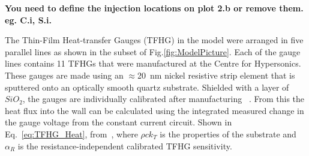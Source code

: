 \documentclass{AIAA}
\begin{document}
\textbf{You need to define the injection locations on plot 2.b or remove them. eg. C.i, S.i.}





\vspace{11 pt}

The Thin-Film Heat-transfer Gauges (TFHG) in the model were arranged in five parallel lines as shown in the subset of Fig.\ref{fig:ModelPicture}.
Each of the gauge lines contains 11 TFHGs that were manufactured at the Centre for Hypersonics. %
These gauges are made using an $\approx$\SI{20}{\nano\meter} nickel resistive strip element that is sputtered onto an optically smooth quartz substrate.
Shielded with a layer of $SiO_2$, the gauges are individually calibrated after manufacturing ~\cite{Wise_Thesis}.
From this the heat flux into the wall can be calculated using the integrated measured change in the gauge voltage from the constant current circuit.
Shown in Eq.~\ref{eq:TFHG_Heat}, from~\cite{Wise_Thesis,Schultz_Book}, where $\rho c k_T$ is the properties of the substrate and $\alpha_R$ is the resistance-independent calibrated TFHG sensitivity.



\end{document}
